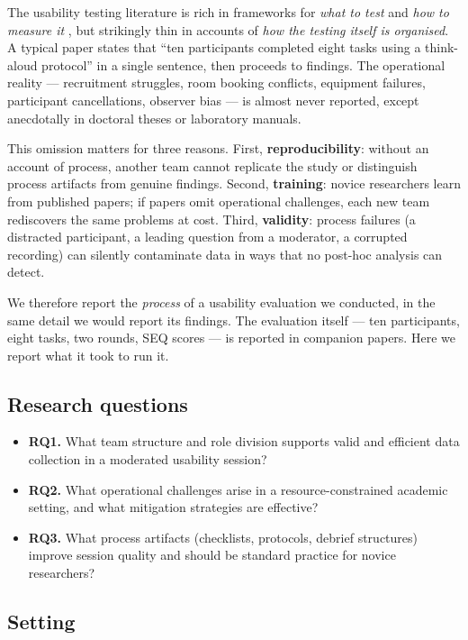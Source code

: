 \documentclass[conference]{IEEEtran}
\begin{document}
The usability testing literature is rich in frameworks for \emph{what to test} and \emph{how to
measure it} \cite{sauro,nielsen}, but strikingly thin in accounts of \emph{how the testing itself is
organised}. A typical paper states that ``ten participants completed eight tasks using a think-aloud
protocol'' in a single sentence, then proceeds to findings. The operational reality --- recruitment
struggles, room booking conflicts, equipment failures, participant cancellations, observer bias ---
is almost never reported, except anecdotally in doctoral theses or laboratory manuals.

This omission matters for three reasons. First, \textbf{reproducibility}: without an account of
process, another team cannot replicate the study or distinguish process artifacts from genuine
findings. Second, \textbf{training}: novice researchers learn from published papers; if papers omit
operational challenges, each new team rediscovers the same problems at cost. Third, \textbf{validity}:
process failures (a distracted participant, a leading question from a moderator, a corrupted
recording) can silently contaminate data in ways that no post-hoc analysis can detect.

We therefore report the \emph{process} of a usability evaluation we conducted, in the same detail we
would report its findings. The evaluation itself --- ten participants, eight tasks, two rounds, SEQ
scores --- is reported in companion papers. Here we report what it took to run it.

\subsection{Research questions}
\begin{itemize}
  \item \textbf{RQ1.} What team structure and role division supports valid and efficient data
    collection in a moderated usability session?
  \item \textbf{RQ2.} What operational challenges arise in a resource-constrained academic setting,
    and what mitigation strategies are effective?
  \item \textbf{RQ3.} What process artifacts (checklists, protocols, debrief structures) improve
    session quality and should be standard practice for novice researchers?
\end{itemize}

\subsection{Setting}
\end{document}
